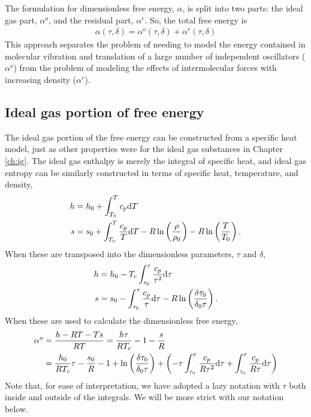 The formulation for dimensionless free energy, $\alpha$, is split into two parts: the ideal gas part, $\alpha^o$, and the residual part, $\alpha^r$.  So, the total free energy is
\begin{align}
\alpha(\tau, \delta) = \alpha^o(\tau, \delta) + \alpha^r(\tau, \delta)\label{eqn:mp:atotal}
\end{align}
This approach separates the problem of needing to model the energy contained in molecular vibration and translation of a large number of independent oscillators ($\alpha^o$) from the problem of modeling the effects of intermolecular forces with increasing density ($\alpha^r$).

\subsection{Ideal gas portion of free energy}\label{sec:mp:ig}
The ideal gas portion of the free energy can be constructed from a specific heat model, just as other properties were for the ideal gas substances in Chapter \ref{ch:ig}.  The ideal gas enthalpy is merely the integral of specific heat, and ideal gas entropy can be similarly constructed in terms of specific heat, temperature, and density,
\begin{subequations}
\begin{align}
h &= h_0 + \int_{T_0}^T c_p \mathrm{d} T\\
s &= s_0 + \int_{T_0}^T \frac{c_p}{T} \mathrm{d} T - R \ln\left(\frac{\rho}{\rho_0}\right) - R\ln\left(\frac{T}{T_0}\right).
\end{align}
\end{subequations}
When these are transposed into the dimensionless parameters, $\tau$ and $\delta$,
\begin{align*}
h &= h_0 - T_c \int_{\tau_0}^\tau \frac{c_p}{\tau^2} \mathrm{d} \tau\\
s &= s_0 - \int_{\tau_0}^\tau \frac{c_p}{\tau} \mathrm{d} \tau - R \ln\left(\frac{\delta \tau_0}{\delta_0 \tau}\right).
\end{align*}
When these are used to calculate the dimensionless free energy,
\begin{align}
\alpha^o &= \frac{h - RT - Ts}{RT} = \frac{h \tau}{R T_c} - 1 - \frac{s}{R}\nonumber\\
 &= \frac{h_0}{RT_c} \tau - \frac{s_0}{R} - 1 + \ln\left(\frac{\delta \tau_0}{\delta_0 \tau}\right) + \left(-\tau\int_{\tau_0}^\tau \frac{c_p}{R \tau^2} \mathrm{d} \tau + \int_{\tau_0}^\tau \frac{c_p}{R \tau} \mathrm{d} \tau \right)\label{eqn:mp:aodef}
\end{align}
Note that, for ease of interpretation, we have adopted a lazy notation with $\tau$ both inside and outside of the integrals.  We will be more strict with our notation below.

